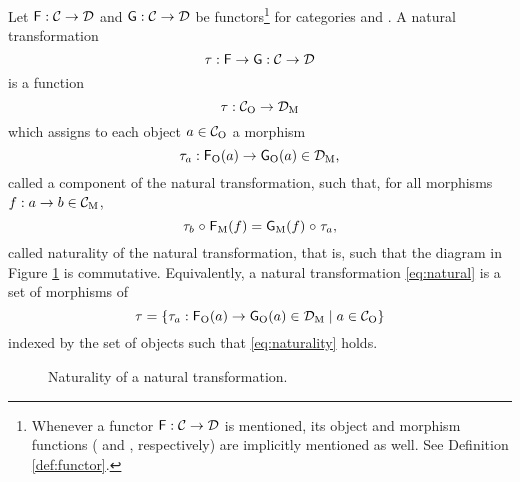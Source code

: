 \begin{definition}
  \label{def:natural}


  Let $\mathsf{F}: \mathcal{C} \to \mathcal{D}$ and $\mathsf{G}: \mathcal{C} \to
  \mathcal{D}$ be functors\footnote{Whenever a functor $\mathsf{F}: \mathcal{C}
    \to \mathcal{D}$ is mentioned, its object and morphism functions
    ( and , respectively) are implicitly mentioned
    as well. See Definition \ref{def:functor}.} for categories 
  and . A natural transformation
  \begin{equation}
    \label{eq:natural}
    \tau: \mathsf{F} \to \mathsf{G}: \mathcal{C} \to \mathcal{D}
  \end{equation}
  is a function
  \begin{equation*}
    \tau: \mathcal{C}_{\operatorname{O}} \to \mathcal{D}_{\operatorname{M}}
  \end{equation*}
  which assigns to each object $a \in \mathcal{C}_{\operatorname{O}}$ a morphism
  \begin{equation*}
    \tau_{a}: \mathsf{F}_{\operatorname{O}}(a) \to \mathsf{G}_{\operatorname{O}}(a) \in \mathcal{D}_{\operatorname{M}}
    \text{,}
  \end{equation*}
  called a component of the natural transformation, such that, for all
  morphisms $f: a \to b \in \mathcal{C}_{\operatorname{M}}$,
  \begin{equation}
    \label{eq:naturality}
    \tau_{b} \mathrel{\circ} \mathsf{F}_{\operatorname{M}}(f) = \mathsf{G}_{\operatorname{M}}(f) \mathrel{\circ} \tau_{a}
    \text{,}
  \end{equation}
  called naturality of the natural transformation, that is, such that
  the diagram in Figure \ref{fig:naturality} is commutative.
  Equivalently, a natural transformation \eqref{eq:natural} is a set
  of morphisms of 
  \begin{equation*}
    \tau = \{\tau_{a}: \mathsf{F}_{\operatorname{O}}(a) \to \mathsf{G}_{\operatorname{O}}(a) \in
    \mathcal{D}_{\operatorname{M}} \mid a \in \mathcal{C}_{\operatorname{O}}\}
  \end{equation*}
  indexed by the set of objects  such that
  \eqref{eq:naturality} holds.

  \begin{figure}[htb]
    \begin{center}
    \end{center}
    \caption{Naturality of a natural transformation.}
    \label{fig:naturality}
  \end{figure}

\end{definition}

